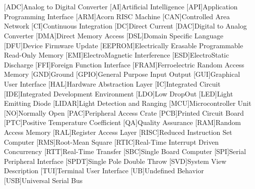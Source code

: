 \cleardoublepage
\chapter*{\listofabbrevname}
{}

\begin{acronym}[KolikMista]

	[ADC]{Analog to Digital Converter}
	[AI]{Artificial Intelligence}
	[API]{Application Programming Interface}
	[ARM]{Acorn RISC Machine}
	[CAN]{Controlled Area Network}
	[CI]{Continuous Integration}
	[DC]{Direct Current}
	[DAC]{Digital to Analog Converter}
	[DMA]{Direct Memory Access}
	[DSL]{Domain Specific Language}
	[DFU]{Device Firmware Update}
	[EEPROM]{Electrically Erasable Programmable Read-Only Memory}
	[EMI]{ElectroMagnetic Interference}
	[ESD]{ElectroStatic Discharge}
	[FFI]{Foreign Function Interface}
	[FRAM]{Ferroelectric Random Access Memory}
	[GND]{Ground}
	[GPIO]{General Purpose Input Output}
	[GUI]{Graphical User Interface}
	[HAL]{Hardware Abstraction Layer}
	[IC]{Integrated Circuit}
	[IDE]{Integrated Development Environment}
	[LDO]{Low DropOut}
	[LED]{Light Emitting Diode}
	[LIDAR]{Light Detection and Ranging}
	[MCU]{Microcontroller Unit}
	[NO]{Normally Open}
	[PAC]{Peripheral Access Crate}
	[PCB]{Printed Circuit Board}
	[PTC]{Positive Temperature Coefficient}
	[QA]{Quality Assurance}
	[RAM]{Random Access Memory}
	[RAL]{Register Access Layer}
	[RISC]{Reduced Instruction Set Computer}
	[RMS]{Root-Mean Square}
	[RTIC]{Real-Time Interrupt Driven Concurrency}
	[RTT]{Real-Time Transfer}
	[SBC]{Single Board Computer}
	[SPI]{Serial Peripheral Interface}
	[SPDT]{Single Pole Double Throw}
	[SVD]{System View Description}
	[TUI]{Terminal User Interface}
	[UB]{Undefined Behavior}
	[USB]{Universal Serial Bus}


\end{acronym}

